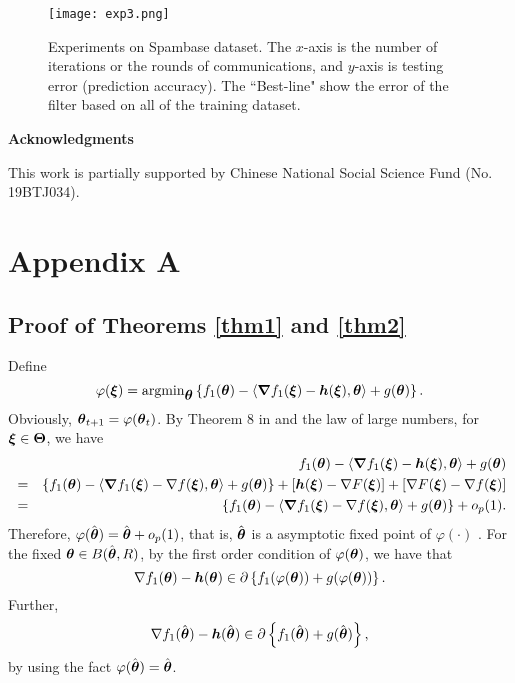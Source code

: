 \documentclass[12pt,a4paper]{article}%
\newcommand{\be}{\begin{equation}}
\newcommand{\ee}{\end{equation}}
\newcommand\bes{\begin{eqnarray}}
\newcommand\ees{\end{eqnarray}}
\newcommand \vc[1]{{\mbox{\boldmath${#1}$}}}
\newcommand \vtheta{\vc \theta}
\numberwithin{equation}{section}
\newcommand{\bbr}[1]{\left\{#1\right\}}      %
\begin{document}
\begin{figure}[ht]
\centering
\texttt{[image: exp3.png]}
\caption{Experiments on Spambase dataset. The $x$-axis is the number of iterations or the rounds of communications, and $y$-axis is testing error (prediction accuracy).
The ``Best-line" show the error of the filter based on all of the training dataset.}
\label{}
\end{figure}





\vskip 0.5cm
{\noindent\bf\large Acknowledgments}

This work is partially supported by Chinese National Social Science Fund (No. 19BTJ034).





\newpage
\def\theequation{A.\arabic{equation}}
\setcounter{equation}{0}
\def\thesubsection{A.\arabic{subsection}}
\setcounter{subsection}{0}


\section*{Appendix A}

\subsection{Proof of Theorems \ref{thm1} and \ref{thm2}}
Define
$$\varphi(\vc\xi)=\mathrm{argmin}_\vtheta\left\{f_1(\vtheta)-\langle\vc \nabla f_1(\vc\xi)-\vc h(\vc\xi),\vtheta\rangle+g(\vtheta)\right\}.$$
Obviously, $\vtheta_{t+1}=\varphi(\vtheta_t)$. By Theorem 8 in \cite{YinChenRB2018} and the law of large numbers, for $\vc\xi\in \vc\Theta$, we have
\bes
&&f_1(\vtheta)-\langle\vc \nabla f_1(\vc\xi)-\vc h(\vc\xi),\vtheta\rangle+g(\vtheta)\nonumber\\
&=&\bbr{f_1(\vtheta)-\langle\vc \nabla f_1(\vc\xi)-\nabla f(\vc\xi),\vtheta\rangle+g(\vtheta)}+[\vc h(\vc\xi)-\nabla F(\vc\xi)]+[\nabla F(\vc\xi)-\nabla f(\vc\xi)]\nonumber\\
&=&\bbr{f_1(\vtheta)-\langle\vc \nabla f_1(\vc\xi)-\nabla f(\vc\xi),\vtheta\rangle+g(\vtheta)}+o_p(1).
\ees
Therefore,  $\varphi(\hat{\vtheta})=\hat{\vtheta}+o_p(1)$, that is, $\hat{\vtheta}$ is a asymptotic fixed point of $\varphi(\cdot)$ . For the fixed $\vtheta\in B(\hat{\vtheta},R)$, by the first order condition of $\varphi(\vtheta)$, we have that
\be\label{eq3-1}
\nabla f_1(\vtheta)-\vc h(\vtheta)\in \partial\bbr{f_1(\varphi(\vtheta))+g(\varphi(\vtheta))}.
\ee
Further,
\be\label{eq3-2}
\nabla f_1(\hat{\vtheta})-\vc h(\hat{\vtheta})\in \partial\bbr{f_1(\hat{\vtheta})+g(\hat{\vtheta})},
\ee
by using the fact $\varphi(\hat{\vtheta})=\hat{\vtheta}$.
\end{document}
